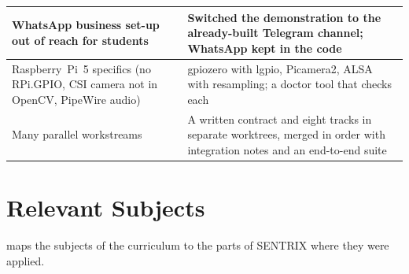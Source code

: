\begin{table}[H]
\begin{tabularx}{\textwidth}{|L{4.2cm}|Y|}
WhatsApp business set-up out of reach for students & Switched the demonstration to the already-built Telegram channel; WhatsApp kept in the code\\ \hline
Raspberry~Pi~5 specifics (no RPi.GPIO, CSI camera not in OpenCV, PipeWire audio) & gpiozero with lgpio, Picamera2, ALSA  with resampling; a doctor tool that checks each\\ \hline
Many parallel workstreams & A written contract and eight tracks in separate worktrees, merged in order with integration notes and an end-to-end suite\\ \hline
\end{tabularx}
\end{table}

\section{Relevant Subjects}
 maps the subjects of the curriculum to the parts of SENTRIX where they were applied.

